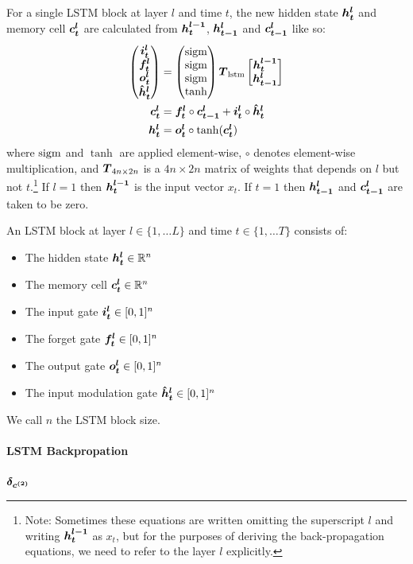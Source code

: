 For a single LSTM block at layer $l$ and time $t$, the new hidden state $\mbox{\boldmath{$h^l_t$}}$ and memory cell $\mbox{\boldmath{$c^l_t$}}$ are calculated from $\mbox{\boldmath{$h_t^{l-1}$}}$, $\mbox{\boldmath{$h_{t-1}^l$}}$ and $\mbox{\boldmath{$c_{t-1}^l$}}$ like so:
\begin{align}
\label{eqn:LSTMdef1}
\begin{pmatrix}
\mbox{\boldmath{$i^l_t$}} \\
\mbox{\boldmath{$f^l_t$}} \\
\mbox{\boldmath{$o^l_t$}} \\
\mbox{\boldmath{$\hat{h}^l_t$}}
\end{pmatrix}
&= 
\begin{pmatrix}
\operatorname{sigm} \\
\operatorname{sigm} \\
\operatorname{sigm} \\
\tanh
\end{pmatrix}
\mbox{\boldmath{$T$}}_{\text{lstm}}
\begin{bmatrix}
  \mbox{\boldmath{$h_t^{l-1}$}} \\
  \mbox{\boldmath{$h_{t-1}^l$}}
 \end{bmatrix} \\
\mbox{\boldmath{$c^l_t$}} &= \mbox{\boldmath{$f^l_t$}} \circ \mbox{\boldmath{$c_{t-1}^l$}} + \mbox{\boldmath{$i^l_t$}} \circ \mbox{\boldmath{$\hat{h}^l_t$}} \\
\mbox{\boldmath{$h^l_t$}} &= \mbox{\boldmath{$o^l_t$}} \circ \tanh(\mbox{\boldmath{$c^l_t$}})
\end{align}
where $\operatorname{sigm}$ and $\tanh$ are applied element-wise, $\circ$ denotes element-wise multiplication, 
and $\mbox{\boldmath{$T$}}_{4n \times 2n}$ is a $4n \times 2n$ matrix of weights that depends on $l$ but not $t$.\footnote{Note: Sometimes these equations are written omitting the superscript $l$ and writing $\mbox{\boldmath{$h_t^{l-1}$}}$ as $x_t$, but for the purposes of deriving the back-propagation equations, we need to refer to the layer $l$ explicitly.}
If $l=1$ then $\mbox{\boldmath{$h_t^{l-1}$}}$ is the input vector $x_t$.
If $t=1$ then $\mbox{\boldmath{$h_{t-1}^l$}}$ and $\mbox{\boldmath{$c_{t-1}^l$}}$ are taken to be zero.

An LSTM block at layer $l \in \{1, \dots L\}$ and time $t \in \{1, \dots T\}$ consists of:
\begin{itemize}
\item The hidden state $\mbox{\boldmath{$h^l_t$}} \in \mathbb{R}^n$
\item The memory cell $\mbox{\boldmath{$c^l_t$}} \in \mathbb{R}^n$
\item The input gate $\mbox{\boldmath{$i^l_t$}} \in [0,1]^n$
\item The forget gate $\mbox{\boldmath{$f^l_t$}} \in [0,1]^n$
\item The output gate $\mbox{\boldmath{$o^l_t$}} \in [0,1]^n$
\item The input modulation gate $\mbox{\boldmath{$\hat{h}^l_t$}} \in [0,1]^n$
\end{itemize}
We call $n$ the LSTM block size.

\paragraph{LSTM Backpropation}
$\mbox{\boldmath{$\delta_{c^{(2)}}$}}$


